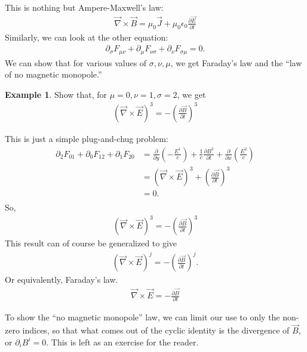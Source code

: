 \documentclass{article}
\theoremstyle{definition}
\newtheorem{exmp}{Example}[section]
\begin{document}
This is nothing but Ampere-Maxwell's law:
\begin{align*}
\boxed{\vec{\nabla}\times\vec{B} =  \mu_0 \vec{J} + \mu_0 \epsilon_0 \frac{\partial \vec{E}}{\partial t}}
\end{align*}
Similarly, we can look at the other equation:
\begin{align*}
\partial_\sigma F_{\mu\nu} + \partial_\mu F_{\nu\sigma} + \partial_\nu F_{\sigma\mu} = 0.
\end{align*}
We can show that for various values of $\sigma, \nu, \mu$, we get Faraday's law and the ``law of no magnetic monopole.''
\begin{exmp}
	Show that, for $\mu = 0, \nu = 1, \sigma = 2$, we get
	\begin{align*}
	\left( \vec{\nabla} \times \vec{E}\right) ^3  = -\left( 
	\frac{\partial \vec{B}}{\partial t} \right)^3
	\end{align*} 
	
	This is just a simple plug-and-chug problem:
	\begin{align*}
	\partial_2 F_{01} + \partial_0 F_{12} + \partial_1 F_{20}
	&= \frac{\partial}{\partial y}\left( -\frac{E^1}{c} \right) + \frac{1}{c}\frac{\partial B^3}{\partial t} + \frac{\partial }{\partial x}\left( \frac{E^2}{c} \right)\\
	&= \left( \vec{\nabla}\times\vec{E} \right)^3 + \left( \frac{\partial \vec{B}}{\partial t}\right)^3\\
	&= 0.\\
	\end{align*}
	So,
	\begin{align*}
	\left( \vec{\nabla} \times \vec{E}\right) ^3  = -\left( 
	\frac{\partial \vec{B}}{\partial t} \right)^3
	\end{align*}
	This result can of course be generalized to give
	\begin{align*}
	\left( \vec{\nabla} \times \vec{E}\right) ^j  = -\left( 
	\frac{\partial \vec{B}}{\partial t} \right)^j.
	\end{align*}
	Or equivalently, Faraday's law. 
	\begin{align*}
	\boxed{{\vec{\nabla} \times \vec{E}  = - 
	\frac{\partial \vec{B}}{\partial t}}}
	\end{align*}
\end{exmp}
To show the ``no magnetic monopole'' law, we can limit our use to only the non-zero indices, so that what comes out of the cyclic identity is the divergence of $\vec{B}$, or $\partial_i B^i = 0$. This is left as an exercise for the reader. \\
\end{document}
